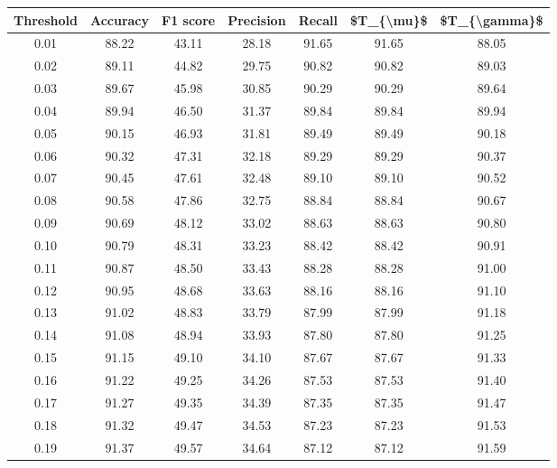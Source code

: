 \begin{tabular}{|c|c|c|c|c|c|c|}
\hline
 Threshold &  Accuracy &  F1 score &  Precision &  Recall &  \$T\_\{\textbackslash mu\}\$ &  \$T\_\{\textbackslash gamma\}\$ \\
\hline
      0.01 &     88.22 &     43.11 &      28.18 &   91.65 &      91.65 &         88.05 \\
      0.02 &     89.11 &     44.82 &      29.75 &   90.82 &      90.82 &         89.03 \\
      0.03 &     89.67 &     45.98 &      30.85 &   90.29 &      90.29 &         89.64 \\
      0.04 &     89.94 &     46.50 &      31.37 &   89.84 &      89.84 &         89.94 \\
      0.05 &     90.15 &     46.93 &      31.81 &   89.49 &      89.49 &         90.18 \\
      0.06 &     90.32 &     47.31 &      32.18 &   89.29 &      89.29 &         90.37 \\
      0.07 &     90.45 &     47.61 &      32.48 &   89.10 &      89.10 &         90.52 \\
      0.08 &     90.58 &     47.86 &      32.75 &   88.84 &      88.84 &         90.67 \\
      0.09 &     90.69 &     48.12 &      33.02 &   88.63 &      88.63 &         90.80 \\
      0.10 &     90.79 &     48.31 &      33.23 &   88.42 &      88.42 &         90.91 \\
      0.11 &     90.87 &     48.50 &      33.43 &   88.28 &      88.28 &         91.00 \\
      0.12 &     90.95 &     48.68 &      33.63 &   88.16 &      88.16 &         91.10 \\
      0.13 &     91.02 &     48.83 &      33.79 &   87.99 &      87.99 &         91.18 \\
      0.14 &     91.08 &     48.94 &      33.93 &   87.80 &      87.80 &         91.25 \\
      0.15 &     91.15 &     49.10 &      34.10 &   87.67 &      87.67 &         91.33 \\
      0.16 &     91.22 &     49.25 &      34.26 &   87.53 &      87.53 &         91.40 \\
      0.17 &     91.27 &     49.35 &      34.39 &   87.35 &      87.35 &         91.47 \\
      0.18 &     91.32 &     49.47 &      34.53 &   87.23 &      87.23 &         91.53 \\
      0.19 &     91.37 &     49.57 &      34.64 &   87.12 &      87.12 &         91.59 \\

\end{tabular}
